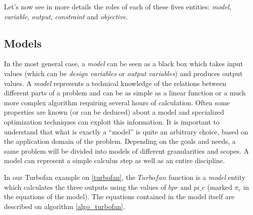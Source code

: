 Let's now see in more details the roles of each of these fives entities: \emph{model}, \emph{variable}, \emph{output}, \emph{constraint} and \emph{objective}.

\subsection{Models}

In the most general case, a \emph{model} can be seen as a black box which takes input values (which can be \emph{design variables} or \emph{output variables}) and produces output values. A \emph{model} represents a technical knowledge of the relations between different parts of a problem and can be as simple as a linear function or a much more complex algorithm requiring several hours of calculation. Often some properties are known (or can be deduced) about a model and specialized optimization techniques can exploit this information. It is important to understand that what is exactly a \enquote{model} is quite an arbitrary choice, based on the application domain of the problem. Depending on the goals and needs, a same problem will be divided into models of different granularities and scopes. A model can represent a simple calculus step as well as an entire discipline.

In our Turbofan example on \figurename{} \ref{turbofan}, the $Turbofan$ function is a \emph{model} entity which calculates the three outputs using the values of $bpr$ and $pi\_c$ (marked $\pi_c$ in the equations of the model). The equations contained in the model itself are described on algorithm \ref{algo_turbofan}.

